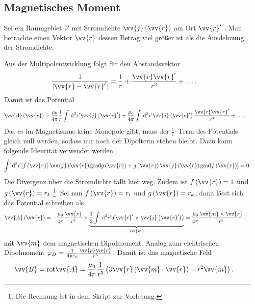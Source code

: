 \documentclass[a4paper,12pt]{article}
\newcommand{\td}{\,\text{d}}
\numberwithin{equation}{section}
\begin{document}
\subsection{Magnetisches Moment}
Sei ein Raumgebiet $\mathcal{V}$ mit Stromdichte $\vv{j}\left(\vv{r}\right)$ am Ort $\vv{r}'$ . 
Man betrachte einen Vektor $\vv{r}$ dessen Betrag viel größer ist als die Ausdehnung der Stromdichte.\par
Aus der Multipolentwicklung folgt für den Abstandsvektor
\begin{align} 
        \dfrac{1}{|\vv{r}-\vv{r}'|}&=\dfrac{1}{r}+\dfrac{\vv{r}\vv{r}'}{r^3}+\hdots 
.\end{align} 
Damit ist das Potential
\begin{align} 
        \vv{A}\left(\vv{r}\right)&=\dfrac{\mu _0}{4\pi }\dfrac{1}{r}\int_{}^{}\td ^3r'\vv{j}\left(\vv{r}'\right)+\dfrac{\mu _o}{4\pi }\int_{}^{}\td ^3r'\vv{j}\left(\vv{r}'\right)\dfrac{\vv{r}\vv{r}'}{r^3}+\hdots 
.\end{align} 
Das es im Magnetismus keine Monopole gibt, muss der $\tfrac{1}{r}$--Term des Potentials gleich null werden, sodass nur noch der Dipolterm stehen bleibt. 
Dazu kann folgende Identität verwendet werden
\begin{align} 
        \int_{}^{}\td ^3r\left[f\left(\vv{r}\right)\vv{j}\left(\vv{r}\right)\text{grad}g\left(\vv{r}\right)+g\left(\vv{r}\right)\vv{j}\left(\vv{r}\right)\text{grad}f\left(\vv{r}\right)\right]=0
.\end{align} 
Die Divergenz über die Stromdichte fällt hier weg. Zudem ist $f\left(\vv{r}\right)=1$ und $g\left(\vv{r}\right)=r_k$.\footnote{Die Rechnung ist in dem Skript zur Vorlesung.}. Sei nun $f\left(\vv{r}\right)=r_i$ und $g\left(\vv{r}\right)=r_k$, dann lässt sich das Potential schreiben als
\begin{align} 
        \vv{A}\left(\vv{r}\right)&=-\dfrac{\mu _0}{4\pi }\dfrac{\vv{r}}{r^3}\times \underbrace{\dfrac{1}{2}\int_{}^{}\td ^3r'\left(\vv{r}'\times \vv{j}\left(\vv{r}'\right)\right)}_{\vv{m}}=\dfrac{\mu _0}{4\pi }\dfrac{\vv{m}\times \vv{r}}{r^3}
,\end{align} 
mit $\vv{m}$ dem magnetischen Dipolmoment. Analog zum elektrischen Dipolmoment $\varphi _D=\tfrac{1}{4\pi \varepsilon _0}\tfrac{\vv{p}\vv{r}}{r^3}$. Damit ist das magnetische Feld
\begin{align} 
        \vv{B}&=\text{rot}\vv{A}=\dfrac{\mu _0}{4\pi }\dfrac{1}{r^5}\left(3\vv{r}\left(\vv{m}\cdot \vv{r}\right)-r^2\vv{m}\right)
.\end{align} 
\end{document}
